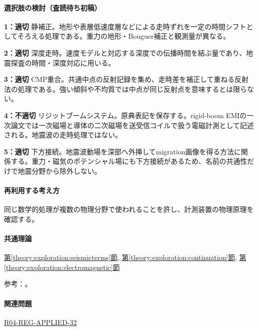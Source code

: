 \paragraph{選択肢の検討（査読待ち初稿）}\mbox{}\par

\noindent\textbf{1：適切} 静補正。地形や表層低速度層などによる走時ずれを一定の時間シフトとしてそろえる処理である。重力の地形・Bouguer補正と観測量が異なる。\par

\noindent\textbf{2：適切} 深度走時。速度モデルと対応する深度での伝播時間を結ぶ量であり、地震探査の時間・深度対応に用いる。\par

\noindent\textbf{3：適切} CMP重合。共通中点の反射記録を集め、走時差を補正して重ねる反射法の処理である。強い傾斜や不均質では中点が同じ反射点を意味するとは限らない。\par

\noindent\textbf{4：不適切} リジットブームシステム。原典表記を保存する。rigid-boom EMIの一次論文では一次磁場と導体の二次磁場を送受信コイルで扱う電磁計測として記述される。地震波の走時処理ではない。\par

\noindent\textbf{5：適切} 下方接続。地震波動場を深部へ外挿してmigration画像を得る方法に関係する。重力・磁気のポテンシャル場にも下方接続があるため、名前の共通性だけで地震分野から除外しない。\par

\paragraph{再利用する考え方} 同じ数学的処理が複数の物理分野で使われることを許し、計測装置の物理原理を確認する。

\paragraph{共通理論} \hyperref[theory:exploration:seismicterms]{第\ref*{theory:exploration:seismicterms}節}, \hyperref[theory:exploration:continuation]{第\ref*{theory:exploration:continuation}節}, \hyperref[theory:exploration:electromagnetic]{第\ref*{theory:exploration:electromagnetic}節}

\par 参考：\cite{usgs_refraction2013,epa_seismic_reflection,usgs_static2004,usgs_processing2000,stanford_downward2001,rigid_boom2019}。

\paragraph{関連問題} \hyperref[q:r04-reg-applied-32]{R04-REG-APPLIED-32}

